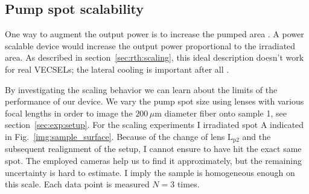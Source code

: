 \subsection{Pump spot scalability}
\label{sec:eval:pumpspot}

One way to augment the output power
is to increase the pumped area
\cite{Tropper2006,Chernikov2010,Korpi2010}.
A power scalable device
would increase the output power
proportional to the irradiated area.
As described in section~\ref{sec:rth:scaling},
this ideal description
doesn't work for real VECSELs;
the lateral cooling
is important
after all
\cite{Chernikov2010}.

By investigating
the scaling behavior
we can learn about
the limits
of the performance
of our device.
We vary the pump spot size
using lenses with various focal lengths
in order to image the $200\,\mu\mathrm{m}$ diameter fiber
onto sample 1,
see section~\ref{sec:exp:setup}.
For the scaling experiments
I irradiated spot A
indicated in Fig.~\ref{img:sample_surface}.
Because of the change
of lens $\mathrm{L}_\mathrm{p2}$
and the subsequent
realignment of the setup,
I cannot ensure to have hit the exact same spot.
The employed cameras help us
to find it approximately,
but the remaining uncertainty is hard to estimate.
I imply the sample is homogeneous enough on this scale.
Each data point
is measured $N=3$ times.








